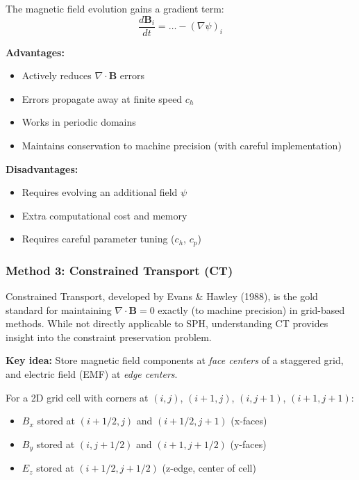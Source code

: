 \documentclass[12pt,a4paper]{article}
\begin{document}
The magnetic field evolution gains a gradient term:
\begin{equation}
\frac{d\bm{B}_i}{dt} = \ldots - (\nabla\psi)_i
\label{eq:B_psi_correction}
\end{equation}

\textbf{Advantages:}
\begin{itemize}
    \item Actively reduces $\nabla \cdot \bm{B}$ errors
    \item Errors propagate away at finite speed $c_h$
    \item Works in periodic domains
    \item Maintains conservation to machine precision (with careful implementation)
\end{itemize}

\textbf{Disadvantages:}
\begin{itemize}
    \item Requires evolving an additional field $\psi$
    \item Extra computational cost and memory
    \item Requires careful parameter tuning ($c_h$, $c_p$)
\end{itemize}

\subsubsection{Method 3: Constrained Transport (CT)}

Constrained Transport, developed by Evans \& Hawley (1988), is the gold standard
for maintaining $\nabla \cdot \bm{B} = 0$ exactly (to machine precision) in
grid-based methods. While not directly applicable to SPH, understanding CT
provides insight into the constraint preservation problem.

\textbf{Key idea:} Store magnetic field components at \textit{face centers}
of a staggered grid, and electric field (EMF) at \textit{edge centers}.

For a 2D grid cell with corners at $(i,j)$, $(i+1,j)$, $(i,j+1)$, $(i+1,j+1)$:
\begin{itemize}
    \item $B_x$ stored at $(i+1/2, j)$ and $(i+1/2, j+1)$ (x-faces)
    \item $B_y$ stored at $(i, j+1/2)$ and $(i+1, j+1/2)$ (y-faces)
    \item $E_z$ stored at $(i+1/2, j+1/2)$ (z-edge, center of cell)
\end{itemize}
\end{document}
